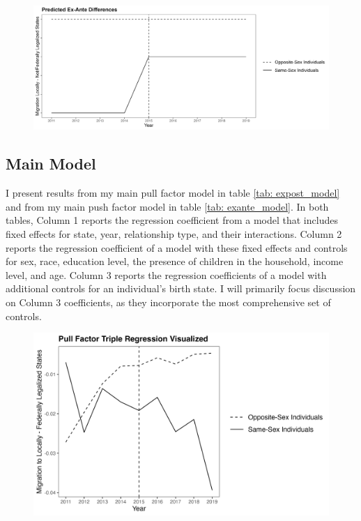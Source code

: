 \documentclass[12pt,letterpaper]{article}
\begin{document}
\begin{figure}[htbp]
    \centering
    \includegraphics[width=0.75\linewidth]{outputs/summary_stats/ex_ante_diffs.png}
    \caption{}
    \label{fig: ex_ante_diffs}
\end{figure}


\FloatBarrier
\subsection{Main Model} %
I present results from my main pull factor model in table \ref{tab: expost_model} and from my main push factor model in table \ref{tab: exante_model}. In both tables, Column 1 reports the regression coefficient from a model that includes fixed effects for state, year, relationship type, and their interactions. Column 2 reports the regression coefficient of a model with these fixed effects and controls for sex, race, education level, the presence of children in the household, income level, and age. Column 3 reports the regression coefficients of a model with additional controls for an individual’s birth state. I will primarily focus discussion on Column 3 coefficients, as they incorporate the most comprehensive set of controls.

\begin{figure}[htbp]
    \centering
    \includegraphics[width=0.75\linewidth]{outputs/summary_stats/post_diffs.png}
    \caption{}
    \label{fig: post_diffs}
\end{figure}
\end{document}
